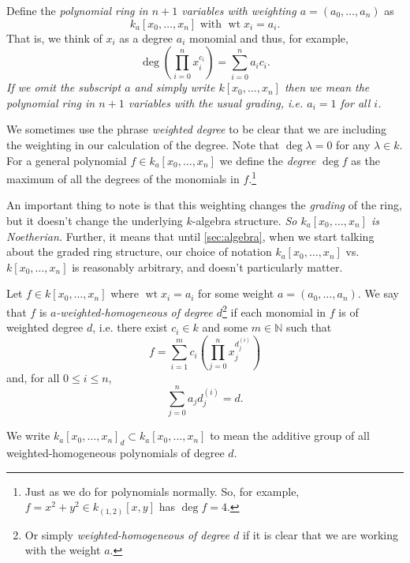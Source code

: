 \documentclass[10pt,notitlepage]{article}
\numberwithin{equation}{subsection}
\DeclareMathOperator{\wt}{wt}
\newcommand{\nn}{\mathbb{N}}
\newcommand{\kazn}{k_a[x_0,\ldots,x_n]}
\begin{document}
\begin{definition}
    Define the \emph{polynomial ring in $n+1$ variables with weighting $a=(a_0,\ldots,a_n)$} as
    \[\kazn\text{ with }\wt x_i=a_i.\]
    That is, we think of $x_i$ as a degree $a_i$ monomial and thus, for example,
    \[\deg\left(\prod_{i=0}^n x_i^{c_i}\right) = \sum_{i=0}^n a_i c_i.\]
    \emph{If we omit the subscript $a$ and simply write $k[x_0,\ldots,x_n]$ then we mean the polynomial ring in $n+1$ variables with the usual grading, i.e. $a_i=1$ for all $i$.}

    We sometimes use the phrase \emph{weighted degree} to be clear that we are including the weighting in our calculation of the degree.
    Note that $\deg\lambda=0$ for any $\lambda\in k$.
    For a general polynomial $f\in\kazn$ we define the \emph{degree} $\deg f$ as the maximum of all the degrees of the monomials in $f$.\footnote{%
        Just as we do for polynomials normally.
        So, for example, $f=x^2+y^2\in k_{(1,2)}[x,y]$ has $\deg f=4$.
    }
\end{definition}

\begin{note}
    An important thing to note is that this weighting changes the \emph{grading} of the ring, but it doesn't change the underlying $k$-algebra structure.
    \emph{So $\kazn$ is Noetherian.}
    Further, it means that until \cref{sec:algebra}, when we start talking about the graded ring structure, our choice of notation $\kazn$ vs. $k[x_0,\ldots,x_n]$ is reasonably arbitrary, and doesn't particularly matter.
\end{note}

\begin{definition}\label{defn:wh-poly}
    Let $f\in k[x_0,\ldots,x_n]$ where $\wt x_i=a_i$ for some weight $a=(a_0,\ldots,a_n)$.
    We say that $f$ is \emph{$a$-weighted-homogeneous of degree $d$}\footnote{%
        Or simply \emph{weighted-homogeneous of degree $d$} if it is clear that we are working with the weight $a$.
    } if each monomial in $f$ is of weighted degree $d$, i.e. there exist $c_i\in k$ and some $m\in\nn$ such that
    \[f = \sum_{i=1}^m c_i\left(\prod_{j=0}^n x_j^{d_j^{(i)}}\right)\]
    and, for all $0\leqslant i\leqslant n$,
    \[\sum_{j=0}^n a_j d_j^{(i)} = d.\]

    We write $\kazn_d\subset\kazn$ to mean the additive group of all weighted-homogeneous polynomials of degree $d$.
\end{definition}
\end{document}
